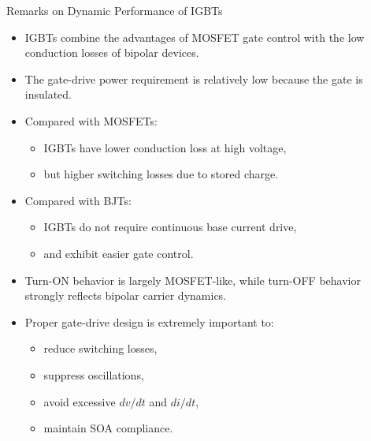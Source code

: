 \begin{frame}{Remarks on Dynamic Performance of IGBTs}
\begin{itemize}
    \item IGBTs combine the advantages of MOSFET gate control with the low conduction losses of bipolar devices.
    
    \item The gate-drive power requirement is relatively low because the gate is insulated.
    
    \item Compared with MOSFETs:
    \begin{itemize}
        \item IGBTs have lower conduction loss at high voltage,
        \item but higher switching losses due to stored charge.
    \end{itemize}
    
    \item Compared with BJTs:
    \begin{itemize}
        \item IGBTs do not require continuous base current drive,
        \item and exhibit easier gate control.
    \end{itemize}
    
    \item Turn-ON behavior is largely MOSFET-like, while turn-OFF behavior strongly reflects bipolar carrier dynamics.
    
    \item Proper gate-drive design is extremely important to:
    \begin{itemize}
        \item reduce switching losses,
        \item suppress oscillations,
        \item avoid excessive $dv/dt$ and $di/dt$,
        \item maintain SOA compliance.
    \end{itemize}
\end{itemize}
\end{frame}

